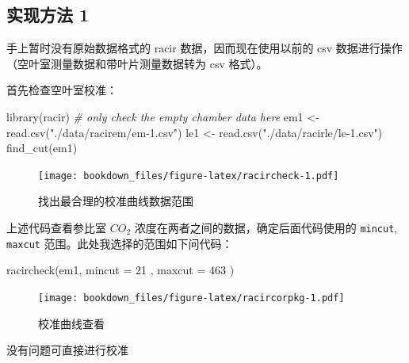 \documentclass[
]{krantz}
\makeatletter
\newenvironment{Shaded}{\begin{snugshade}}{\end{snugshade}}
\newcommand{\AttributeTok}[1]{\textcolor[rgb]{0.77,0.63,0.00}{#1}}
\newcommand{\CommentTok}[1]{\textcolor[rgb]{0.56,0.35,0.01}{\textit{#1}}}
\newcommand{\DecValTok}[1]{\textcolor[rgb]{0.00,0.00,0.81}{#1}}
\newcommand{\FunctionTok}[1]{\textcolor[rgb]{0.00,0.00,0.00}{#1}}
\newcommand{\NormalTok}[1]{#1}
\newcommand{\OtherTok}[1]{\textcolor[rgb]{0.56,0.35,0.01}{#1}}
\newcommand{\SpecialCharTok}[1]{\textcolor[rgb]{0.00,0.00,0.00}{#1}}
\newcommand{\StringTok}[1]{\textcolor[rgb]{0.31,0.60,0.02}{#1}}
\newenvironment{kframe}{%
\medskip{}
\setlength{\fboxsep}{.8em}
 \def\at@end@of@kframe{}%
 \ifinner\ifhmode%
  \def\at@end@of@kframe{\end{minipage}}%
  \begin{minipage}{\columnwidth}%
 \fi\fi%
 \def\FrameCommand##1{\hskip\@totalleftmargin \hskip-\fboxsep
 \colorbox{shadecolor}{##1}\hskip-\fboxsep
     \hskip-\linewidth \hskip-\@totalleftmargin \hskip\columnwidth}%
 \MakeFramed {\advance\hsize-\width
   \@totalleftmargin\z@ \linewidth\hsize
   \@setminipage}}%
 {\par\unskip\endMakeFramed%
 \at@end@of@kframe}
\renewenvironment{Shaded}{\begin{kframe}}{\end{kframe}}
\makeatother
\begin{document}
\hypertarget{racir_pkg_1}{%
\subsection{实现方法 1}\label{racir_pkg_1}}

手上暂时没有原始数据格式的 racir 数据，因而现在使用以前的 csv 数据进行操作（空叶室测量数据和带叶片测量数据转为 csv 格式）。

首先检查空叶室校准：

\begin{Shaded}
\begin{Highlighting}[]
\FunctionTok{library}\NormalTok{(racir)}
\CommentTok{\# only check the empty chamber data here}
\NormalTok{em1 }\OtherTok{\textless{}{-}} \FunctionTok{read.csv}\NormalTok{(}\StringTok{"./data/racirem/em{-}1.csv"}\NormalTok{)}
\NormalTok{le1 }\OtherTok{\textless{}{-}} \FunctionTok{read.csv}\NormalTok{(}\StringTok{"./data/racirle/le{-}1.csv"}\NormalTok{)}
\FunctionTok{find\_cut}\NormalTok{(em1)}
\end{Highlighting}
\end{Shaded}

\begin{figure}
\centering
\texttt{[image: bookdown\_files/figure-latex/racircheck-1.pdf]}
\caption{\label{fig:racircheck}找出最合理的校准曲线数据范围}
\end{figure}

上述代码查看参比室 \(CO_2\) 浓度在两者之间的数据，确定后面代码使用的 \texttt{mincut}, \texttt{maxcut} 范围。此处我选择的范围如下问代码：

\begin{Shaded}
\begin{Highlighting}[]
\FunctionTok{racircheck}\NormalTok{(em1, }\AttributeTok{mincut =} \DecValTok{21}\NormalTok{ , }\AttributeTok{maxcut =} \DecValTok{463}\NormalTok{ )}
\end{Highlighting}
\end{Shaded}

\begin{figure}
\centering
\texttt{[image: bookdown\_files/figure-latex/racircorpkg-1.pdf]}
\caption{\label{fig:racircorpkg}校准曲线查看}
\end{figure}

没有问题可直接进行校准

\begin{Shaded}
\end{Shaded}
\end{document}
